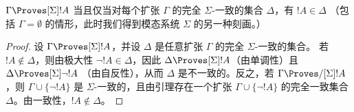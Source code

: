 \documentclass[../../../include/open-logic-section]{subfiles}
\begin{document}
\begin{cor}
  $\Gamma \Proves[\Sigma] !A$ 当且仅当对每个扩张 $\Gamma$ 的完全 $\Sigma$-一致的集合
  $\Delta$，有 $!A \in \Delta$
  （包括 $\Gamma = \emptyset$ 的情形，此时我们得到模态系统 $\Sigma$ 的另一种刻画。）
\end{cor}

\begin{proof}
  设 $\Gamma \Proves[\Sigma] !A$，并设 $\Delta$ 是任意扩张 $\Gamma$ 的完全 $\Sigma$-一致的集合。
  若 $!A \notin \Delta$，则由极大性 $\lnot!A \in \Delta$，因此
  $\Delta \Proves[\Sigma] !A$（由单调性）且 $\Delta \Proves[\Sigma] \lnot!A$
  （由自反性），从而 $\Delta$ 是不一致的。反之，若 $\Gamma \Proves/[\Sigma] !A$，则
  $\Gamma \cup \{ \lnot!A\}$ 是 $\Sigma$-一致的，且由引理存在一个扩张
  $\Gamma \cup \{ \lnot!A \}$ 的完全一致集合 $\Delta$。由一致性，$!A \notin \Delta$。
\end{proof}
\end{document}
